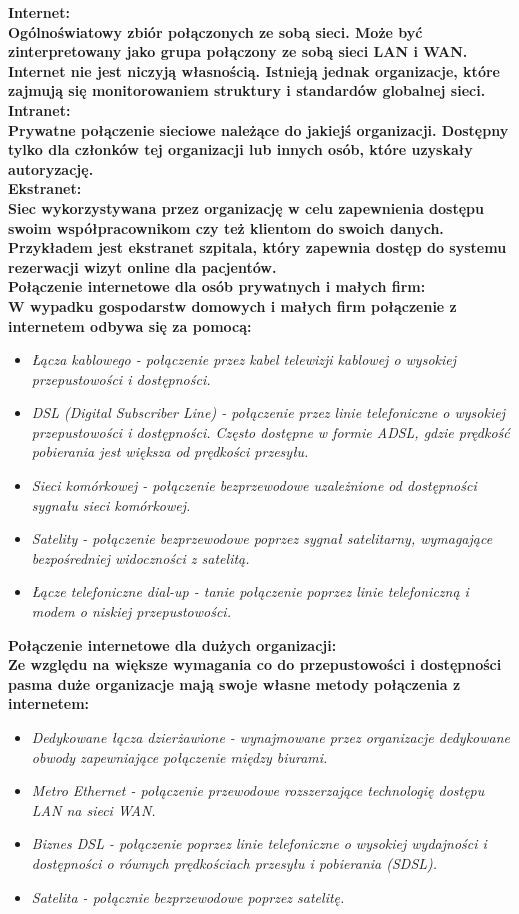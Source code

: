 \documentclass[a4paper,12pt]{article}
\newcommand{\h}[1]{\noindent \bf #1 \rm \\ \noindent}
\newcommand{\italic}[1]{\it #1 \rm}
\begin{document}
\h{Internet:}
Ogólnoświatowy zbiór połączonych ze sobą sieci. Może być zinterpretowany jako grupa połączony ze sobą sieci LAN i WAN. Internet nie jest niczyją własnością. Istnieją jednak organizacje, które zajmują się monitorowaniem struktury i standardów globalnej sieci.\\

\h{Intranet:}
Prywatne połączenie sieciowe należące do jakiejś organizacji. Dostępny tylko dla członków tej organizacji lub innych osób, które uzyskały autoryzację.\\

\h{Ekstranet:}
Siec wykorzystywana przez organizację w celu zapewnienia dostępu swoim współpracownikom czy też klientom do swoich danych. Przykładem jest ekstranet szpitala, który zapewnia dostęp do systemu rezerwacji wizyt online dla pacjentów.\\

\h{Połączenie internetowe dla osób prywatnych i małych firm:}
W wypadku gospodarstw domowych i małych firm połączenie z internetem odbywa się za pomocą:
\begin{itemize}
	\item \italic{Łącza kablowego} - połączenie przez kabel telewizji kablowej o wysokiej przepustowości i dostępności.
	\item \italic{DSL (Digital Subscriber Line)} - połączenie przez linie telefoniczne o wysokiej przepustowości i dostępności. Często dostępne w formie ADSL, gdzie prędkość pobierania jest większa od prędkości przesyłu.
	\item \italic{Sieci komórkowej} - połączenie bezprzewodowe uzależnione od dostępności sygnału sieci komórkowej.
	\item \italic{Satelity} - połączenie bezprzewodowe poprzez sygnał satelitarny, wymagające bezpośredniej widoczności z satelitą.
	\item \italic{Łącze telefoniczne dial-up} - tanie połączenie poprzez linie telefoniczną i modem o niskiej przepustowości.
\end{itemize}
\vspace{5mm}

\h{Połączenie internetowe dla dużych organizacji:}
Ze względu na większe wymagania co do przepustowości i dostępności pasma duże organizacje mają swoje własne metody połączenia z internetem:
\begin{itemize}
	\item \italic{Dedykowane łącza dzierżawione} - wynajmowane przez organizacje dedykowane obwody zapewniające połączenie między biurami.
	\item \italic{Metro Ethernet} - połączenie przewodowe rozszerzające technologię dostępu LAN na sieci WAN.
	\item \italic{Biznes DSL} - połączenie poprzez linie telefoniczne o wysokiej wydajności i dostępności o równych prędkościach przesyłu i pobierania (SDSL). 
	\item \italic{Satelita} - połącznie bezprzewodowe poprzez satelitę.
\end{itemize}
\vspace{5mm}
\end{document}
